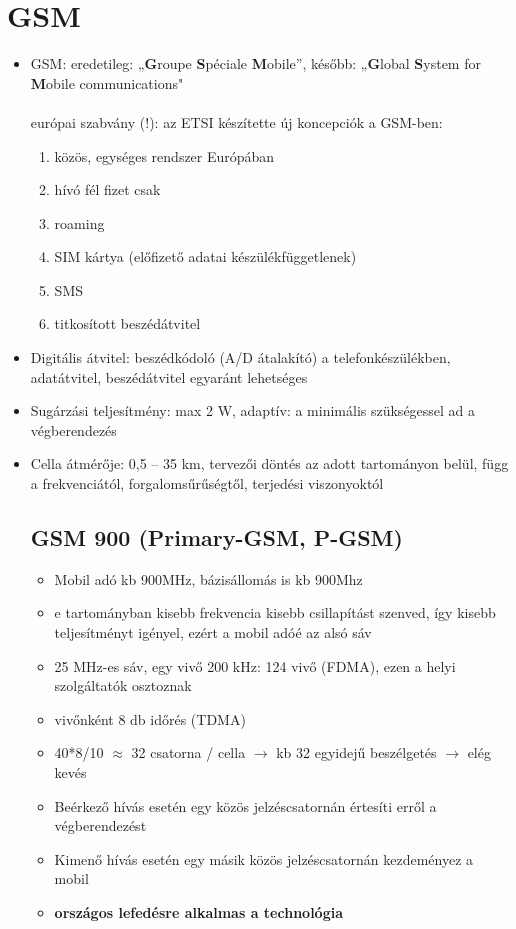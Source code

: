 \documentclass[10pt,a4paper]{article}
\begin{document}
\section{GSM}
\begin{itemize}
\item GSM: eredetileg: „\textbf{G}roupe \textbf{S}péciale \textbf{M}obile”, később: „\textbf{G}lobal \textbf{S}ystem for \textbf{M}obile communications" \\ \\
európai szabvány (!): az ETSI készítette
új koncepciók a GSM-ben:
\begin{enumerate}
	\item közös, egységes rendszer Európában
	\item hívó fél fizet csak
	\item roaming
	\item SIM kártya (előfizető adatai készülékfüggetlenek)
	\item SMS
	\item titkosított beszédátvitel
\end{enumerate}
\item Digitális átvitel: beszédkódoló (A/D átalakító) a telefonkészülékben, adatátvitel, beszédátvitel egyaránt lehetséges
\item  Sugárzási teljesítmény: max 2 W, adaptív: a minimális
szükségessel ad a végberendezés
\item Cella átmérője: 0,5 – 35 km, tervezői döntés az adott tartományon belül, függ a frekvenciától, forgalomsűrűségtől, terjedési viszonyoktól
\subsection{GSM 900 (Primary-GSM, P-GSM)}
\begin{itemize}
	\item Mobil adó kb 900MHz, bázisállomás is kb 900Mhz
	\item e tartományban kisebb frekvencia kisebb csillapítást szenved,
	így kisebb teljesítményt igényel, ezért a mobil adóé az alsó sáv
	\item 25 MHz-es sáv, egy vivő 200 kHz: 124 vivő (FDMA), ezen a helyi szolgáltatók osztoznak
	\item vivőnként 8 db időrés (TDMA)
	\item 40*8/10 $\approx$ 32 csatorna / cella $\rightarrow$ kb 32 egyidejű beszélgetés $\rightarrow$ elég kevés
	\item Beérkező hívás esetén egy közös jelzéscsatornán értesíti erről a
	végberendezést
	\item Kimenő hívás esetén egy másik közös jelzéscsatornán kezdeményez a
	mobil
	\item \textbf{országos lefedésre alkalmas a technológia}
\end{itemize}

\end{itemize}
\end{document}
